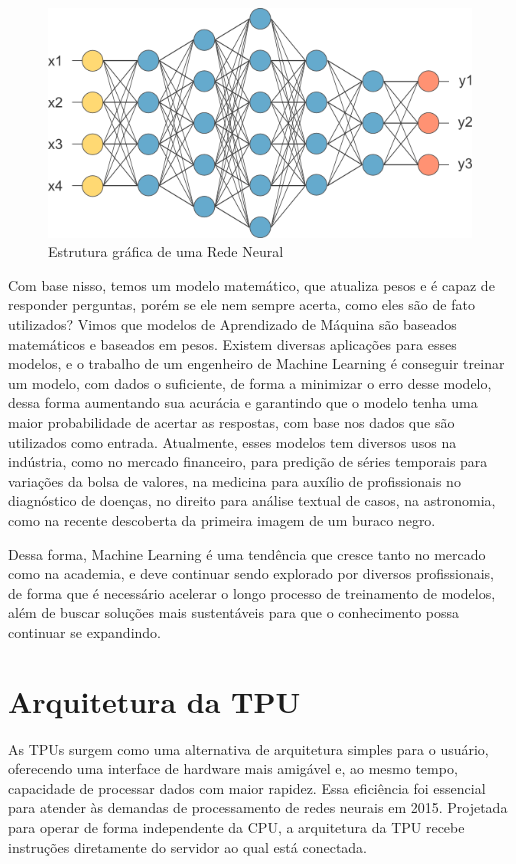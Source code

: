 \documentclass{report}
\begin{document}
\begin{figure}[h]
	\includegraphics[scale=0.7]{neuralNetwork}
	\centering
	\caption{Estrutura gráfica de uma Rede Neural}
\end{figure}

Com base nisso, temos um modelo matemático, que atualiza pesos e é capaz de responder perguntas, porém se ele nem sempre acerta, como eles são de fato utilizados? Vimos que modelos de Aprendizado de Máquina são baseados matemáticos e baseados em pesos. Existem diversas aplicações para esses modelos, e o trabalho de um engenheiro de Machine Learning é conseguir treinar um modelo, com dados o suficiente, de forma a minimizar o erro desse modelo, dessa forma aumentando sua acurácia e garantindo que o modelo tenha uma maior probabilidade de acertar as respostas, com base nos dados que são utilizados como entrada. Atualmente, esses modelos tem diversos usos na indústria, como no mercado financeiro, para predição de séries temporais para variações da bolsa de valores, na medicina para auxílio de profissionais no diagnóstico de doenças, no direito para análise textual de casos, na astronomia, como na recente descoberta da primeira imagem de um buraco negro. 

Dessa forma, Machine Learning é uma tendência que cresce tanto no mercado como na academia, e deve continuar sendo explorado por diversos profissionais, de forma que é necessário acelerar o longo processo de treinamento de modelos, além de buscar soluções mais sustentáveis para que o conhecimento possa continuar se expandindo.


\chapter{Arquitetura da TPU}

As TPUs surgem como uma alternativa de arquitetura simples para o usuário, oferecendo uma interface de hardware mais amigável e, ao mesmo tempo, capacidade de processar dados com maior rapidez. Essa eficiência foi essencial para atender às demandas de processamento de redes neurais em 2015. Projetada para operar de forma independente da CPU, a arquitetura da TPU recebe instruções diretamente do servidor ao qual está conectada.
\end{document}
